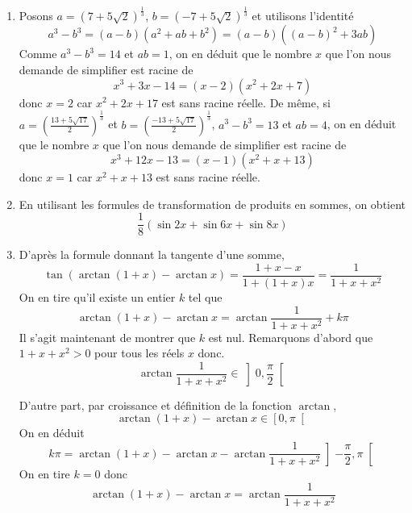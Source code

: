 \begin{enumerate}
\begin{enumerate}
\end{enumerate}

\item  Posons $a=(7+5\sqrt{2})^{\frac{1}{3}}$, $b=(-7+5\sqrt{2})^{\frac{1}{3}}$ et utilisons l'identit{\'e}
\begin{displaymath}
a^{3}-b^{3}=(a-b)(a^{2}+ab+b^{2})=(a-b)((a-b)^{2}+3ab)
\end{displaymath}
Comme $a^{3}-b^{3}=14$ et $ab=1$, on en d{\'e}duit que le nombre $x$ que l'on nous demande de simplifier est racine de
\begin{displaymath}
x^{3}+3x-14=(x-2)(x^{2}+2x+7)
\end{displaymath}
donc $x=2$ car $x^{2}+2x+17$ est sans racine r{\'e}elle.\newline
De m{\^e}me, si $a=\left( \frac{13+5\sqrt{17}}{2}\right) ^{\frac{1}{3}}$ et $b=\left( \frac{-13+5\sqrt{17}}{2}\right) ^{\frac{1}{3}}$, $a^{3}-b^{3}=13$
et $ab=4$, on en d{\'e}duit que le nombre $x$ que l'on nous demande de simplifier est racine de
\begin{displaymath}
x^{3}+12x-13=(x-1)(x^{2}+x+13)
\end{displaymath}
donc $x=1$ car $x^{2}+x+13$ est sans racine r{\'e}elle.
 
\item En utilisant les formules de transformation de produits en sommes, on obtient
\begin{displaymath}
\frac{1}{8}(\sin 2x+\sin 6x+\sin 8x)
\end{displaymath}

\item D'après la formule donnant la tangente d'une somme,
\begin{displaymath}
\tan (\arctan (1+x)-\arctan x)=\frac{1+x-x}{1+(1+x)x}=\frac{1}{1+x+x^{2}}
\end{displaymath}
On en tire qu'il existe un entier $k$ tel que
\begin{displaymath}
  \arctan (1+x)-\arctan x = \arctan \frac{1}{1+x+x^{2}} + k\pi
\end{displaymath}
Il s'agit maintenant de montrer que $k$ est nul.\newline
Remarquons d'abord que $1+x+x^{2}>0$ pour tous les r{\'e}els $x$ donc.
\begin{displaymath}
  \arctan \frac{1}{1+x+x^{2}} \in \left]0,\frac{\pi}{2}\right[
\end{displaymath}

D'autre part, par croissance et d{\'e}finition de la fonction $\arctan $, 
\begin{displaymath}
\arctan (1+x)-\arctan x\in \left[ 0,\pi \right[   
\end{displaymath}
On en déduit
\begin{displaymath}
k\pi = \arctan (1+x)-\arctan x - \arctan \frac{1}{1+x+x^{2}} \left]-\frac{\pi}{2}, \pi\right[
\end{displaymath}
On en tire $k=0$ donc
\begin{displaymath}
\arctan (1+x)-\arctan x=\arctan \frac{1}{1+x+x^{2}}
\end{displaymath}
\end{enumerate}